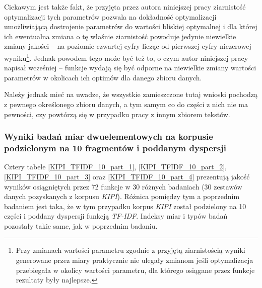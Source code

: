 \par
Ciekawym jest także fakt, że przyjęta przez autora niniejszej pracy ziarnistość optymalizacji tych parametrów pozwala na dokładność optymalizacji umożliwiającą dostrojenie parametrów do wartości bliskiej optymalnej i dla której ich ewentualna zmiana o tę właśnie ziarnistość powoduje jedynie niewielkie zmiany jakości -- na poziomie czwartej cyfry licząc od pierwszej cyfry niezerowej wyniku\footnote{Przy zmianach wartości parametru zgodnie z przyjętą ziarnistością wyniki generowane przez miary praktycznie nie ulegały zmianom jeśli optymalizacja przebiegała w okolicy wartości parametru, dla którego osiągane przez funkcje rezultaty były najlepsze.}.
Jednak powodem tego może być też to, o czym autor niniejszej pracy napisał wcześniej -- funkcje wydają się być odporne na niewielkie zmiany wartości parametrów w okolicach ich optimów dla danego zbioru danych.

\par
Należy jednak mieć na uwadze, że wszystkie zamieszczone tutaj wnioski pochodzą z pewnego określonego zbioru danych, a tym samym co do części z nich nie ma pewności, czy powtórzą się w przypadku pracy z innym zbiorem tekstów.


\subsubsection{Wyniki badań miar dwuelementowych na korpusie podzielonym na 10 fragmentów i poddanym dyspersji}
Cztery tabele \ref{KIPI_TFIDF_10_part_1}, \ref{KIPI_TFIDF_10_part_2}, \ref{KIPI_TFIDF_10_part_3} oraz \ref{KIPI_TFIDF_10_part_4} prezentują jakość wyników osiągniętych przez 72 funkcje w 30 różnych badaniach (30 zestawów danych pozyskanych z korpusu \emph{KIPI}).
Różnica pomiędzy tym a poprzednim badaniem jest taka, że w tym przypadku korpus \emph{KIPI} został podzielony na 10 części i poddany dyspersji funkcją \emph{TF-IDF}.
Indeksy miar i typów badań pozostały takie same, jak w poprzednim badaniu.

